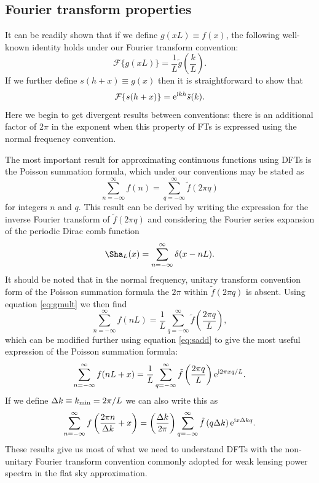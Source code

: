 \documentclass[preprint]{aastex}
\newcommand{\mi}{{\rm i}}
\newcommand{\me}{{\rm e}}
\begin{document}
\subsection{Fourier transform properties}
It can be readily shown that if we define $g(x L) \equiv f(x)$, the following well-known identity holds
under our Fourier transform convention:
\begin{equation}
\mathcal{F}\{g(x L)\} = \frac{1}{L}
\tilde{g}\left(\frac{k}{L}\right). \label{eq:gmult}
\end{equation}
If we further define $s(h + x) \equiv g(x)$ then it is straightforward
to show that
\begin{equation}
\mathcal{F}\{ s(h + x) \} = \me^{\mi k h} \tilde{s}(k).  \label{eq:sadd}
\end{equation}
Here we begin to get divergent results between conventions: there is
an additional factor of $2\pi$ in the exponent when this property of
FTs is expressed using the normal frequency
convention.

The most important result for approximating continuous functions using
DFTs is the Poisson summation formula, which under our conventions may
be stated as
\begin{equation}
\sum_{n=-\infty}^{\infty} f(n) = \sum_{q=-\infty}^{\infty} \tilde{f}(2
\pi q)
\end{equation}
for integers $n$ and $q$.  This result can be derived by writing the
  expression for the inverse Fourier transform of $\tilde{f}(2 \pi
q)$ and considering the Fourier series expansion of the periodic Dirac comb
function
\begin{equation}
\Sha_L (x) = \sum_{n=-\infty}^{\infty} \delta(x - nL).
\end{equation}
It should be noted that in the normal frequency, unitary transform
convention form of the Poisson summation formula the $2\pi$ within $\tilde{f}(2 \pi
q)$ is absent.  Using equation \eqref{eq:gmult} we then find
\begin{equation}
\sum_{n=-\infty}^{\infty} f(n L) = \frac{1}{L}
\sum_{q=-\infty}^{\infty} \tilde{f} \left(\frac{2 \pi q}{L} \right),
\end{equation}
which can be modified further using equation \eqref{eq:sadd} to give
the most useful expression of the Poisson summation formula:
\begin{equation}
\sum_{n=-\infty}^{\infty} f(n L + x) = \frac{1}{L}
\sum_{q=-\infty}^{\infty} \tilde{f} \left(\frac{2 \pi  q}{L} \right)
\me^{\mi 2 \pi x q / L}.
\end{equation}
If we define $\Delta k \equiv k_{\rm min} = 2 \pi / L$ we can also write
this as
\begin{equation}
\sum_{n=-\infty}^{\infty} f\left(\frac{2\pi n}{\Delta k} + x \right) = 
\left(\frac{\Delta k}{2 \pi} \right)
\sum_{q=-\infty}^{\infty} \tilde{f} \left(q \Delta k \right)
\me^{\mi x \Delta k q }. \label{eq:poisson}
\end{equation}
These results give us most of what we need to understand DFTs with the
non-unitary Fourier transform convention commonly adopted for weak
lensing power spectra in the flat sky approximation.
\end{document}
